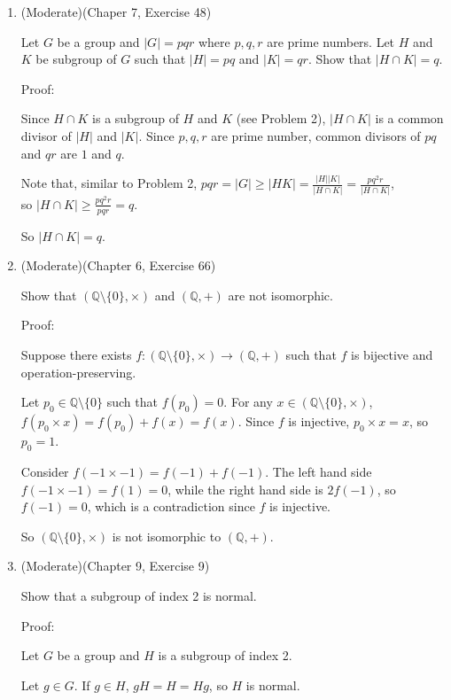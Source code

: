 \documentclass[12pt]{article}
\newcommand{\Q}{\mathbb{Q}}
\begin{document}
\begin{enumerate}
    \item (Moderate)(Chaper 7, Exercise 48)

        Let $G$ be a group and $|G| = pqr$ where $p,q,r$ are prime numbers. Let $H$ and $K$ be subgroup of $G$ such that $|H| = pq$ and $|K| = qr$. Show that $|H \cap K| = q$.

        Proof:

        Since $H \cap K$ is a subgroup of $H$ and $K$ (see Problem 2), $|H \cap K|$ is a common divisor of $|H|$ and $|K|$. Since $p,q,r$ are prime number, common divisors of $pq$ and $qr$ are $1$ and $q$.

        Note that, similar to Problem 2, $pqr = |G| \geq |HK| = \frac{|H||K|}{|H \cap K|} = \frac{pq^2r}{|H \cap K|}$,\\ so $|H \cap K| \geq \frac{pq^2r}{pqr} = q$.

        So $|H \cap K| = q$.
        \pagebreak

    \item (Moderate)(Chapter 6, Exercise 66)

        Show that $(\Q \setminus \{0\} , \times)$ and $(\Q, +)$ are not isomorphic.

        Proof:

        Suppose there exists $f:(\Q \setminus \{0\} , \times) \to (\Q, +)$ such that $f$ is bijective and operation-preserving.

        Let $p_0 \in \Q \setminus \{0\}$ such that $f(p_0) = 0$. For any $x \in(\Q \setminus \{0\} , \times)$, \\$f(p_0 \times x ) = f(p_0) + f(x) = f(x)$. Since $f$ is injective, $p_0 \times x = x$, so $p_0 = 1$.

        Consider $f(-1 \times -1) = f(-1) + f(-1)$. The left hand side $f(-1 \times -1) = f(1) = 0$, while the right hand side is $2f(-1)$, so $f(-1) = 0$, which is a contradiction since $f$ is injective.

        So $(\Q\setminus\{0\}, \times)$ is not isomorphic to $(\Q, +)$.
        \pagebreak

    \item (Moderate)(Chapter 9, Exercise 9)

        Show that a subgroup of index 2 is normal.

        Proof:

        Let $G$ be a group and $H$ is a subgroup of index 2.

        Let $g \in G$. If $g \in H$, $gH = H = Hg$, so $H$ is normal.


\end{enumerate}
\end{document}

